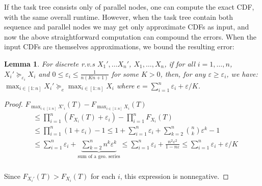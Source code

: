 \documentclass{article}
\newtheorem{lemma}{Lemma}
\begin{document}
If the task tree consists only of parallel nodes, one can
compute the exact CDF, with the same overall runtime.
However, when the task tree contain both sequence and parallel nodes we may get
only approximate CDFs as input, and now the above straightforward computation can compound the errors.
When the input CDFs are themselves approximations, we bound the resulting error:

\begin{lemma} \label{appPalTheorem}
For discrete r.v.s $X_1', \dots X_n'$, $X_1, \dots,X_n$, if for all $i=1,\dots,n$,  $X_i' \succeq_{\varepsilon_i} X_i$ and $0\leq\varepsilon_i\leq  \frac{1}{n (K n+1)}$ for some $K>0$,
then, for any $\varepsilon \geq \varepsilon_i$, we have: $\max_{i\in[1:n]}X_i' \succeq_{e} \max_{i\in[1:n]}X_i$ where $e=\sum_{i=1}^n \varepsilon_i + \varepsilon/K$.
\end{lemma}
\begin{proof}
$F_{\max_{i\in[1:n]}X'_i}
 (T) {-} F_{\max_{i\in[1:n]}X_i}
 (T)$
{\small
\begin{align*} 
&\leq \prod_{i=1}^n (F_{X_i}(T)+\varepsilon_i) {-} \prod_{i=1}^n F_{X_i}(T) \\
&\leq \prod_{i=1}^n (1+\varepsilon_i) - 1 
\leq 1+\sum_{i=1}^n \varepsilon_i + \sum_{k=2}^n {n \choose k}  \varepsilon^k - 1 \\
&\leq \sum_{i=1}^n \varepsilon_i + \!\!\!\!\underbrace{\sum_{k=2}^n n^k  \varepsilon^k}_{\text{sum of a geo. series}}\!\!\!\!
\leq \sum_{i=1}^n \varepsilon_i + \frac{n^2 \varepsilon^2}{1-n \varepsilon}
\leq \sum_{i=1}^n \varepsilon_i + \varepsilon/K\\
\end{align*}}

Since $F_{X_i'}(T) > F_{X_i}(T)$ for each $i$, this expression is nonnegative.
\end{proof}

\end{document}
